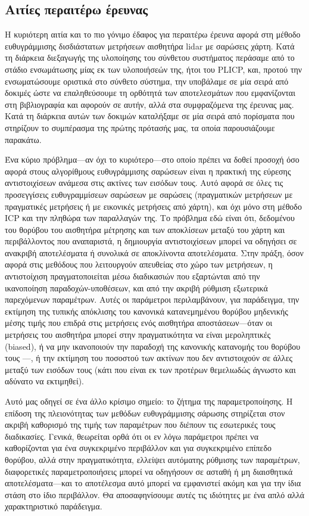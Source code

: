 \subsection{Αιτίες περαιτέρω έρευνας}
\label{subsection:02_02_05:02}

Η κυριότερη αιτία και το πιο γόνιμο έδαφος για περαιτέρω έρευνα αφορά στη
μέθοδο ευθυγράμμισης δισδιάστατων μετρήσεων αισθητήρα lidar με σαρώσεις χάρτη.
Κατά τη διάρκεια διεξαγωγής της υλοποίησης του σύνθετου συστήματος περάσαμε από
το στάδιο ενσωμάτωσης μίας εκ των υλοποιήσεών της, ήτοι του PLICP, και, προτού
την ενσωματώσουμε οριστικά στο σύνθετο σύστημα, την υποβάλαμε σε μία σειρά από
δοκιμές ώστε να επαληθεύσουμε τη ορθότητά των αποτελεσμάτων που εμφανίζονται
στη βιβλιογραφία και αφορούν σε αυτήν, αλλά στα συμφραζόμενα της έρευνας μας.
Κατά τη διάρκεια αυτών των δοκιμών καταλήξαμε σε μία σειρά από πορίσματα που
στηρίζουν το συμπέρασμα της πρώτης πρότασής μας, τα οποία παρουσιάζουμε
παρακάτω.

Ένα κύριο πρόβλημα---αν όχι το κυριότερο---στο οποίο πρέπει να δοθεί προσοχή
όσο αφορά στους αλγορίθμους ευθυγράμμισης σαρώσεων είναι η πρακτική της εύρεσης
αντιστοιχίσεων ανάμεσα στις ακτίνες των εισόδων τους. Αυτό αφορά σε όλες τις
προσεγγίσεις ευθυγραμμίσεων σαρώσεων με σαρώσεις (πραγματικών μετρήσεων με
πραγματικές μετρήσεις ή με εικονικές μετρήσεις από χάρτη), και όχι μόνο στη
μέθοδο ICP και την πληθώρα των παραλλαγών της. Το πρόβλημα εδώ είναι ότι,
δεδομένου του θορύβου του αισθητήρα μέτρησης και των αποκλίσεων μεταξύ του
χάρτη και περιβάλλοντος που αναπαριστά, η δημιουργία αντιστοιχίσεων μπορεί να
οδηγήσει σε ανακριβή αποτελέσματα ή συνολικά σε αποκλίνοντα αποτελέσματα. Στην
πράξη, όσον αφορά στις μεθόδους που λειτουργούν απευθείας στο χώρο των
μετρήσεων, η αντιστοίχιση πραγματοποιείται μέσω διαδικασιών που εξαρτώνται από
την ικανοποίηση παραδοχών-υποθέσεων, και από την ακριβή ρύθμιση εξωτερικά
παρεχόμενων παραμέτρων. Αυτές οι παράμετροι περιλαμβάνουν, για παράδειγμα, την
εκτίμηση της τυπικής απόκλισης του κανονικά κατανεμημένου θορύβου μηδενικής
μέσης τιμής που επιδρά στις μετρήσεις ενός αισθητήρα αποστάσεων---όταν οι
μετρήσεις του αισθητήρα μπορεί στην πραγματικότητα να είναι μεροληπτικές
(biased), ή να μην ικανοποιούν την παραδοχή της κανονικής κατανομής του θορύβου
τους \cite{Cooper2018a}---, ή την εκτίμηση του ποσοστού των ακτίνων που δεν
αντιστοιχούν σε άλλες μεταξύ των εισόδων τους (κάτι που είναι εκ των προτέρων
θεμελιωδώς άγνωστο και αδύνατο να εκτιμηθεί).

Αυτό μας οδηγεί σε ένα άλλο κρίσιμο σημείο: το ζήτημα της παραμετροποίησης. Η
επίδοση της πλειονότητας των μεθόδων ευθυγράμμισης σάρωσης στηρίζεται στον
ακριβή καθορισμό της τιμής των παραμέτρων που διέπουν τις εσωτερικές τους
διαδικασίες. Γενικά, θεωρείται ορθά ότι οι εν λόγω παράμετροι πρέπει να
καθορίζονται για ένα συγκεκριμένο περιβάλλον και για συγκεκριμένο επίπεδο
θορύβου, αλλά στην πραγματικότητα, ελλείψει αυτόματης ρύθμισης των παραμέτρων,
διαφορετικές παραμετροποιήσεις μπορεί να οδηγήσουν σε ασταθή ή μη διαισθητικά
αποτελέσματα---και το αποτέλεσμα αυτό μπορεί να εμφανιστεί ακόμη και για την
ίδια στάση στο ίδιο περιβάλλον. Θα αποσαφηνίσουμε αυτές τις ιδιότητες με ένα
απλό αλλά χαρακτηριστικό παράδειγμα.

